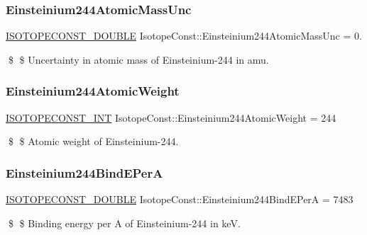 \subsubsection{\texorpdfstring{Einsteinium244\+Atomic\+Mass\+Unc}{Einsteinium244AtomicMassUnc}}
{\footnotesize\ttfamily \mbox{\hyperlink{group___isotope_const-_macros_ga8f45a7272ce02c0b4c65c44636ed719a}{I\+S\+O\+T\+O\+P\+E\+C\+O\+N\+S\+T\+\_\+\+D\+O\+U\+B\+LE}} Isotope\+Const\+::\+Einsteinium244\+Atomic\+Mass\+Unc = 0.}

\$ \$ Uncertainty in atomic mass of Einsteinium-\/244 in amu. \mbox{\label{group___isotope_const-_einsteinium-_es244_ga7e2817366316e463a28e494f6be1e3ce}} 
\subsubsection{\texorpdfstring{Einsteinium244\+Atomic\+Weight}{Einsteinium244AtomicWeight}}
{\footnotesize\ttfamily \mbox{\hyperlink{group___isotope_const-_macros_ga5f18360b3e99483a35c32d789e62621c}{I\+S\+O\+T\+O\+P\+E\+C\+O\+N\+S\+T\+\_\+\+I\+NT}} Isotope\+Const\+::\+Einsteinium244\+Atomic\+Weight = 244}

\$ \$ Atomic weight of Einsteinium-\/244. \mbox{\label{group___isotope_const-_einsteinium-_es244_ga0b8ce2d8ebad184bd118726ab1600a79}} 
\subsubsection{\texorpdfstring{Einsteinium244\+Bind\+E\+PerA}{Einsteinium244BindEPerA}}
{\footnotesize\ttfamily \mbox{\hyperlink{group___isotope_const-_macros_ga8f45a7272ce02c0b4c65c44636ed719a}{I\+S\+O\+T\+O\+P\+E\+C\+O\+N\+S\+T\+\_\+\+D\+O\+U\+B\+LE}} Isotope\+Const\+::\+Einsteinium244\+Bind\+E\+PerA = 7483}

\$ \$ Binding energy per A of Einsteinium-\/244 in keV. \mbox{\label{group___isotope_const-_einsteinium-_es244_gabcdc4fa7417401eaf5668c254e113e65}} 
